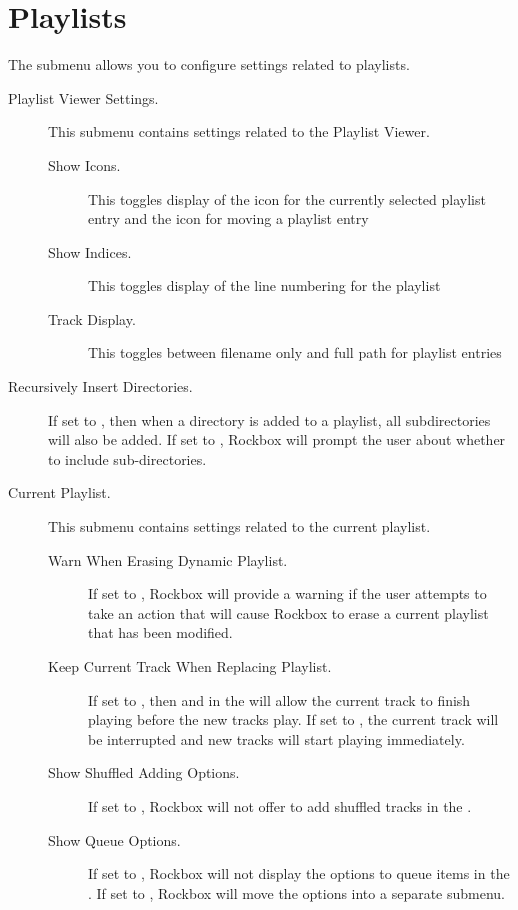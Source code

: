 \section{\label{ref:PlaylistOptions}Playlists}

The  submenu allows you to configure settings
related to playlists.


\begin{description}

\item[Playlist Viewer Settings.]
   This submenu contains settings related to the Playlist Viewer.
   \begin{description}
    \item[Show Icons.] This toggles display of the icon for the currently
    selected playlist entry and the icon for moving a playlist entry
    \item[Show Indices.] This toggles display of the line numbering for
       the playlist
    \item[Track Display.] This toggles between filename only and full path
       for playlist entries
  \end{description}

\item[Recursively Insert Directories.]
  If set to , then when a directory is added to a playlist,
  all subdirectories will also be added. If set to ,
  Rockbox will prompt the user about whether to include sub-directories.

\item[Current Playlist.]
  This submenu contains settings related to the current playlist.
  \begin{description}

  \item[Warn When Erasing Dynamic Playlist.]
  If set to , Rockbox will provide a warning if the user attempts to
  take an action that will cause Rockbox to erase a current playlist that has been
  modified.

  \item[Keep Current Track When Replacing Playlist.]
  If set to , then  and  in
  the  will allow the current track to finish
  playing before the new tracks play. If set to , the current
  track will be interrupted and new tracks will start playing immediately.

  \item[Show Shuffled Adding Options.]
  If set to , Rockbox will not offer to add shuffled tracks
  in the .

  \item[Show Queue Options.]
  If set to , Rockbox will not display the options to queue items in
  the .
  If set to , Rockbox will move the options into a
  separate submenu.

  \end{description}

\end{description}
